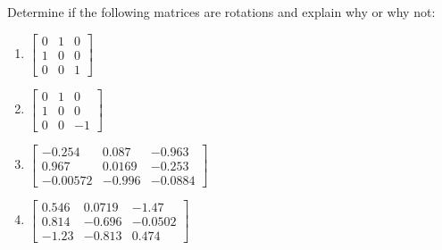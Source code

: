 \documentclass[12pt]{article}
\newenvironment{problem}[2][Problem]{\begin{trivlist}
\item[\hskip \labelsep {\bfseries #1}\hskip \labelsep {\bfseries #2.}]}{\end{trivlist}}
\begin{document}
\begin{problem}{4}%
Determine if the following matrices are rotations and explain why or why not:
\begin{enumerate}[label=(\alph*)]
    \item $\begin{bmatrix}
        0 & 1 & 0 \\
        1 & 0 & 0 \\
        0 & 0 & 1
        \end{bmatrix} $
    \item $\begin{bmatrix}
        0 & 1 & 0 \\
        1 & 0 & 0 \\
        0 & 0 & -1
        \end{bmatrix} $
    \item $\begin{bmatrix}
        -0.254 & 0.087 & -0.963 \\
        0.967 & 0.0169 & -0.253 \\
        -0.00572 & -0.996 & -0.0884
        \end{bmatrix} $
    \item $\begin{bmatrix}
        0.546 & 0.0719 & -1.47 \\
        0.814 & -0.696 & -0.0502 \\
        -1.23 & -0.813 & 0.474
        \end{bmatrix} $
\end{enumerate}

\end{problem}
\newpage
\end{document}
